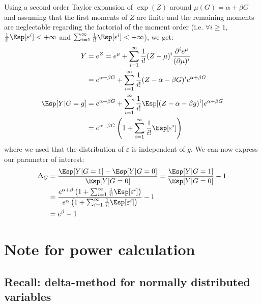 \documentclass[12pt]{article}
\begin{document}
Using a second order Taylor expansion of \(\exp(Z)\) around
\(\mu(G)=\alpha + \beta G\) and assuming that the first moments of
\(Z\) are finite and the remaining moments are neglectable regarding
the factorial of the moment order (i.e. \(\forall i \geq 1\),
\(\frac{1}{i!}\Esp[\varepsilon^i ]< +\infty\) and \(\sum_{i=1}^{\infty} \frac{1}{i!}\Esp[\varepsilon^i ]< +\infty\)), we get:
\begin{align*}
Y &= e^{Z} = e^{\mu} + \sum_{i=1}^{\infty} \frac{1}{i!} (Z - \mu)^i \frac{\partial^i e^{\mu}}{(\partial \mu)^i} \\
&= e^{\alpha + \beta G} + \sum_{i=1}^{\infty} \frac{1}{i!} (Z - \alpha - \beta G)^i e^{\alpha + \beta G} \\
\Esp[Y|G=g] &= e^{\alpha + \beta G} + \sum_{i=1}^{\infty} \frac{1}{i!} \Esp[(Z - \alpha - \beta g)^i] e^{\alpha + \beta G} \\
&= e^{\alpha + \beta G} \left(1 + \sum_{i=1}^{\infty} \frac{1}{i!} \Esp[\varepsilon^i] \right)
\end{align*}
where we used that the distribution of \(\varepsilon\) is independent
of \(g\). We can now express our parameter of interest:
\begin{align*}
\Delta_G &= \frac{\Esp[Y|G=1]-\Esp[Y|G=0]}{\Esp[Y|G=0]} = \frac{\Esp[Y|G=1]}{\Esp[Y|G=0]} - 1 \\
&= \frac{e^{\alpha + \beta} \left(1 + \sum_{i=1}^{\infty} \frac{1}{i!} \Esp[\varepsilon^{i}] \right)}{e^{\alpha} \left(1 + \sum_{i=1}^{\infty} \frac{1}{i!} \Esp[\varepsilon^{i}] \right)} - 1 \\
&= e^{\beta} - 1
\end{align*}


\clearpage

\section{Note for power calculation}
\label{sec:orgf815396}

\subsection{Recall: delta-method for normally distributed variables}
\label{sec:org10cbeff}
\end{document}

